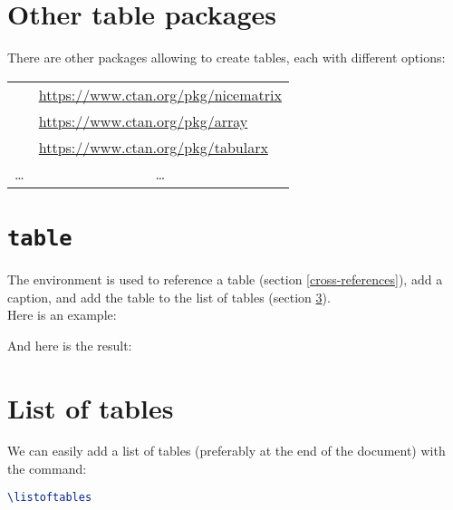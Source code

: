 \section{Other table packages}

There are other packages allowing to create tables, each with different options:
\begin{center}
	\begin{tabular}{l l}
		\quoteEnv{nicematrix} & \url{https://www.ctan.org/pkg/nicematrix} \\
		\quoteEnv{array} & \url{https://www.ctan.org/pkg/array} \\
		\quoteEnv{tabularx} & \url{https://www.ctan.org/pkg/tabularx} \\
		\multicolumn{1}{c}{\dots} & \multicolumn{1}{c}{\dots} \\
	\end{tabular}
\end{center}



\section{\texttt{table}} \label{table-env}

The  environment is used to reference a table (section  \ref{cross-references}), add a caption, and add the table to the list of tables (section \ref{list-of-tables}). \\

Here is an example:


And here is the result:




\section{List of tables} \label{list-of-tables}

We can easily add a list of tables (preferably at the end of the document) with the  command:
\begin{lstlisting}[language=tex]
\listoftables
\end{lstlisting}
